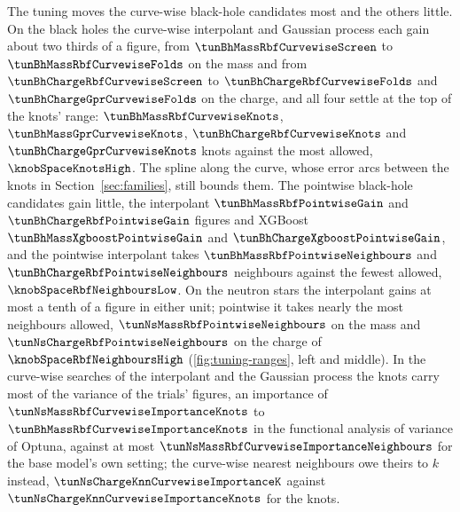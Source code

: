 The tuning moves the curve-wise black-hole candidates most and the others little. On the black holes the curve-wise interpolant and Gaussian process each gain about two thirds of a figure, from $\tunBhMassRbfCurvewiseScreen$ to $\tunBhMassRbfCurvewiseFolds$ on the mass and from $\tunBhChargeRbfCurvewiseScreen$ to $\tunBhChargeRbfCurvewiseFolds$ and $\tunBhChargeGprCurvewiseFolds$ on the charge, and all four settle at the top of the knots' range: $\tunBhMassRbfCurvewiseKnots$, $\tunBhMassGprCurvewiseKnots$, $\tunBhChargeRbfCurvewiseKnots$ and $\tunBhChargeGprCurvewiseKnots$ knots against the most allowed, $\knobSpaceKnotsHigh$. The spline along the curve, whose error arcs between the knots in Section~\ref{sec:families}, still bounds them. The pointwise black-hole candidates gain little, the interpolant $\tunBhMassRbfPointwiseGain$ and $\tunBhChargeRbfPointwiseGain$ figures and XGBoost $\tunBhMassXgboostPointwiseGain$ and $\tunBhChargeXgboostPointwiseGain$, and the pointwise interpolant takes $\tunBhMassRbfPointwiseNeighbours$ and $\tunBhChargeRbfPointwiseNeighbours$ neighbours against the fewest allowed, $\knobSpaceRbfNeighboursLow$. On the neutron stars the interpolant gains at most a tenth of a figure in either unit; pointwise it takes nearly the most neighbours allowed, $\tunNsMassRbfPointwiseNeighbours$ on the mass and $\tunNsChargeRbfPointwiseNeighbours$ on the charge of $\knobSpaceRbfNeighboursHigh$ (\cref{fig:tuning-ranges}, left and middle). In the curve-wise searches of the interpolant and the Gaussian process the knots carry most of the variance of the trials' figures, an importance of $\tunNsMassRbfCurvewiseImportanceKnots$ to $\tunBhMassRbfCurvewiseImportanceKnots$ in the functional analysis of variance of Optuna, against at most $\tunNsMassRbfCurvewiseImportanceNeighbours$ for the base model's own setting; the curve-wise nearest neighbours owe theirs to $k$ instead, $\tunNsChargeKnnCurvewiseImportanceK$ against $\tunNsChargeKnnCurvewiseImportanceKnots$ for the knots.

